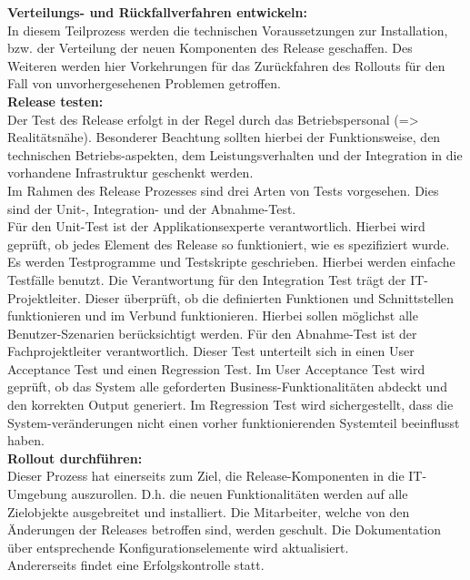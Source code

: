 \textbf{Verteilungs- und Rückfallverfahren entwickeln:}
\\
In diesem Teilprozess werden die technischen Voraussetzungen zur Installation, bzw. der Verteilung der neuen Komponenten des Release geschaffen. Des Weiteren werden hier Vorkehrungen für das Zurückfahren des Rollouts für den Fall von unvorhergesehenen Problemen getroffen. \cite{wiki-it}
\\
\textbf{Release testen:}
\\
Der Test des Release erfolgt in der Regel durch das Betriebspersonal (=> Realitätsnähe). Besonderer Beachtung sollten hierbei der Funktionsweise, den technischen Betriebs-aspekten, dem Leistungsverhalten und der Integration in die vorhandene Infrastruktur geschenkt werden.  
\cite{rm-schiefer-erik}
\\
Im Rahmen des Release Prozesses sind drei Arten von Tests vorgesehen. Dies sind der Unit-, Integration- und der Abnahme-Test. \cite{rm-pilorget} 
\\
Für den Unit-Test ist der Applikationsexperte verantwortlich. Hierbei wird geprüft, ob jedes Element des Release so funktioniert, wie es spezifiziert wurde. Es werden Testprogramme und Testskripte geschrieben. Hierbei werden einfache Testfälle benutzt. 
Die Verantwortung für den Integration Test trägt der IT-Projektleiter. Dieser überprüft, ob die definierten Funktionen und Schnittstellen funktionieren und im Verbund funktionieren. Hierbei sollen möglichst alle Benutzer-Szenarien berücksichtigt werden. 
Für den Abnahme-Test ist der Fachprojektleiter verantwortlich. Dieser Test unterteilt sich in einen User Acceptance Test und einen Regression Test. Im User Acceptance Test wird geprüft, ob das System alle geforderten Business-Funktionalitäten abdeckt und den korrekten Output generiert. Im Regression Test wird sichergestellt, dass die System-veränderungen nicht einen vorher funktionierenden Systemteil beeinflusst haben. 
\\
\textbf{Rollout durchführen:}
\\
Dieser Prozess hat einerseits zum Ziel, die Release-Komponenten in die IT-Umgebung auszurollen. D.h. die neuen Funktionalitäten werden auf alle Zielobjekte ausgebreitet und installiert. Die Mitarbeiter, welche von den Änderungen der Releases betroffen sind, werden geschult. Die Dokumentation über entsprechende Konfigurationselemente wird aktualisiert. 
\cite{rm-pilorget}
\\ 
Andererseits findet eine Erfolgskontrolle statt. \cite{wiki-it}
